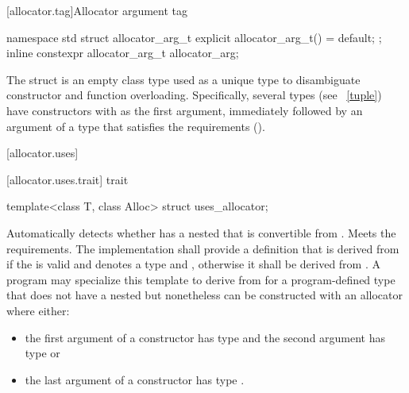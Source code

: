 [allocator.tag]{Allocator argument tag}

%
%
\begin{itemdecl}
namespace std {
  struct allocator_arg_t { explicit allocator_arg_t() = default; };
  inline constexpr allocator_arg_t allocator_arg{};
}
\end{itemdecl}

\pnum
The  struct is an empty class type used as a unique type to
disambiguate constructor and function overloading. Specifically, several types (see
~\ref{tuple}) have constructors with  as the first
argument, immediately followed by an argument of a type that satisfies the
 requirements ().

[allocator.uses]{}

[allocator.uses.trait]{ trait}

%
\begin{itemdecl}
template<class T, class Alloc> struct uses_allocator;
\end{itemdecl}

\begin{itemdescr}
\pnum
\remarks Automatically detects whether  has a nested  that
is convertible from . Meets the 
requirements. The implementation shall provide a definition that is
derived from  if the  
is valid and denotes a type and
, otherwise it shall be
derived from . A program may specialize this template to derive from
 for a program-defined type  that does not have a nested
 but nonetheless can be constructed with an allocator where
either:

\begin{itemize}
\item the first argument of a constructor has type  and the
second argument has type  or

\item the last argument of a constructor has type .
\end{itemize}
\end{itemdescr}

